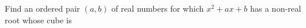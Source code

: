 Find an ordered pair $(a,b)$ of real numbers for which $x^2+ax+b$ has a non-real root whose cube is 